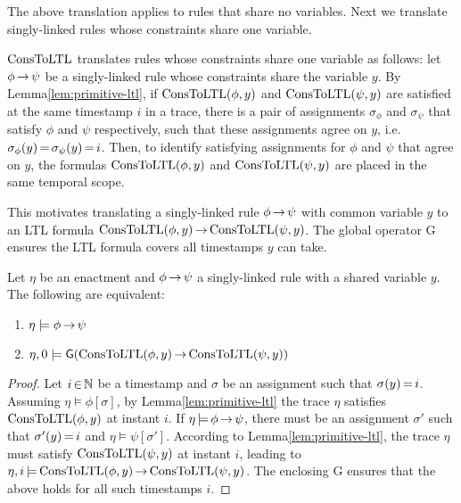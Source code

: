 The above translation applies to rules that share no variables.
Next we translate singly-linked rules whose constraints
share one variable.

$\text{ConsToLTL}$ translates rules whose constraints
share one variable as follows:
let $\phi\,{\rightarrow}\,\psi$ be a singly-linked rule
whose constraints share the variable $y$.
By Lemma\:\ref{lem:primitive-ltl},
if $\text{ConsToLTL}(\phi,y)$ and $\text{ConsToLTL}(\psi,y)$ are satisfied
at the same timestamp $i$ in a trace,
there is a pair of assignments $\sigma_\phi$ and $\sigma_\psi$
that satisfy $\phi$ and $\psi$ respectively,
such that these assignments agree on $y$,
i.e. $\sigma_\phi(y)\,{=}\,\sigma_\psi(y)\,{=}\,i$.
Then, to identify satisfying assignments
for $\phi$ and $\psi$ that agree on $y$,
the formulas 
$\text{ConsToLTL}(\phi,y)$ and $\text{ConsToLTL}(\psi,y)$
are placed in the same temporal scope.

This motivates translating a singly-linked rule
$\phi\,{\to}\,\psi$
with common variable $y$
to an LTL formula
$\text{ConsToLTL}(\phi,y)\,{\rightarrow}\,\text{ConsToLTL}(\psi,y)$.
The global operator {\sf G}
ensures the LTL formula covers all timestamps $y$ can take.


\begin{thm}\label{thm:rule-ltl-t1}
  Let $\eta$ be an enactment and
  $\phi\,{\to}\,\psi$ a singly-linked rule
  with a shared variable $y$.
  The following are equivalent:
  \begin{enumerate}
  \item $\eta \models \phi\,{\rightarrow}\,\psi$
  \item $\eta,0\models {\sf G}
    (\text{ConsToLTL}(\phi,y)\,{\rightarrow}\,\text{ConsToLTL}(\psi,y))$
  \end{enumerate}
\end{thm}

\begin{proof}
Let $i\,{\in}\,\mathbb{N}$ be a timestamp
and $\sigma$ be an assignment
such that $\sigma(y)\,{=}\,i$.
Assuming $\eta\models\phi[\sigma]$,
by Lemma\:\ref{lem:primitive-ltl}
the trace $\eta$ satisfies $\text{ConsToLTL}(\phi,y)$ at instant $i$.
If $\eta\,{\models}\,\phi\,{\rightarrow}\,\psi$,
there must be an assignment $\sigma'$ such that
$\sigma'(y)\,{=}\,i$
and $\eta\models\psi[\sigma']$.
According to Lemma\:\ref{lem:primitive-ltl},
the trace $\eta$ must satisfy
$\text{ConsToLTL}(\psi,y)$ at instant $i$,
leading to
$\eta,i\,{\models}\, \text{ConsToLTL}(\phi,y)\,{\rightarrow}\,\text{ConsToLTL}(\psi,y)$.
The enclosing {\sf G} ensures that the above holds for all such timestamps $i$.
\end{proof}

